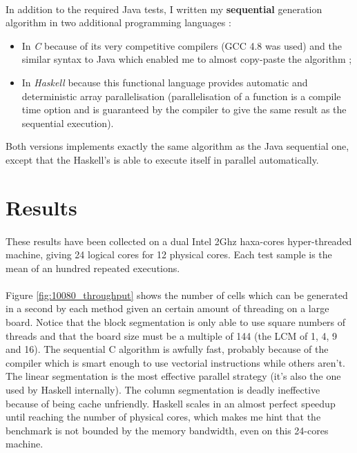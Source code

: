 \documentclass[a4paper]{article}
\begin{document}
    \paragraph{}In addition to the required Java tests, I written my
\textbf{sequential} generation algorithm in two additional programming
languages :
    \begin{itemize}
        \item In \textit{C} because of its very competitive compilers (GCC 4.8
was used) and the similar syntax to Java which enabled me to almost copy-paste
the algorithm ;
        \item In \textit{Haskell} because this functional language provides
automatic and deterministic array parallelisation (parallelisation of a function
is a compile time option and is guaranteed by the compiler to give the same
result as the sequential execution).
    \end{itemize}
Both versions implements exactly the same algorithm as the Java sequential one,
except that the Haskell's is able to execute itself in parallel automatically.

  \section{Results}

    \paragraph{}These results have been collected on a dual Intel 2Ghz
haxa-cores hyper-threaded machine, giving 24 logical cores for 12 physical 
cores. Each test sample is the mean of an hundred repeated executions.

    \paragraph{}Figure \ref{fig:10080_throughput} shows the number of cells
which can be generated in a second by each method given an certain amount of
threading on a large board. Notice that the block segmentation is only able to
use square numbers of threads and that the board size must be a multiple of 144
(the LCM of 1, 4, 9 and 16). \newline
The sequential C algorithm is awfully fast, probably because of the compiler
which is smart enough to use vectorial instructions while others aren't.\newline
The linear segmentation is the most effective parallel strategy (it's also the
one used by Haskell internally). The column segmentation is deadly ineffective
because of being cache unfriendly. Haskell scales in an almost perfect speedup
until reaching the number of physical cores, which makes me hint that the
benchmark is not bounded by the memory bandwidth, even on this 24-cores machine.
\end{document}

